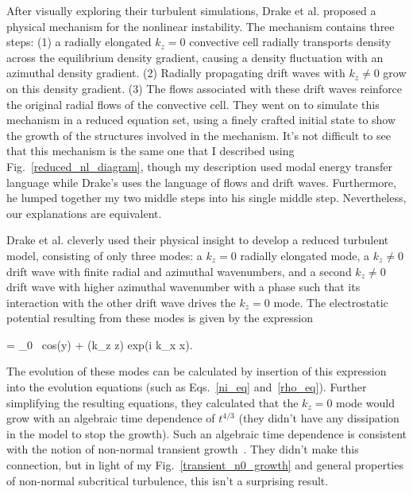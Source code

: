 After visually exploring their turbulent simulations, Drake et al. proposed a physical mechanism for the nonlinear instability. The mechanism contains three steps: (1) a radially elongated $k_z = 0$
convective cell radially transports density across the equilibrium density gradient, causing a density fluctuation with an azimuthal density gradient. (2) Radially propagating 
drift waves with $k_z \ne 0$ grow on this density gradient. (3) The flows associated with these drift waves reinforce the original radial flows of the convective cell. They went on to simulate
this mechanism in a reduced equation set, using a finely crafted initial state to show the growth of the structures involved in the mechanism. It's not difficult to see that this mechanism
is the same one that I described using Fig.~\ref{reduced_nl_diagram}, though my description used modal energy transfer language while Drake's uses the language of flows and drift waves.
Furthermore, he lumped together my two middle steps into his single middle step. Nevertheless, our explanations are equivalent.

Drake et al. cleverly used their physical insight to develop a reduced turbulent model, consisting of only three modes: a $k_z = 0$ radially elongated mode, a $k_z \ne 0$ drift wave with finite
radial and azimuthal wavenumbers, and a second $k_z \ne 0$ drift wave with higher azimuthal wavenumber with a phase such that its interaction with the other drift wave drives the $k_z = 0$
mode. The electrostatic potential resulting from these modes is given by the expression

\beq
\label{drake_potential}
\phi = \phi_0 \ {\rm cos}(\pi y) +  (k_z z) {\rm exp}(i k_x x).
\eeq

The evolution of these modes can be calculated by insertion of this expression into the evolution equations (such as Eqs.~\ref{ni_eq} and~\ref{rho_eq}). Further simplifying the resulting equations, 
they calculated that the $k_z = 0$ mode would grow with an algebraic time dependence of $t^{4/3}$ (they didn't have any dissipation in the model to stop the growth). Such an algebraic time
dependence is consistent with the notion of non-normal transient growth~\cite{waleffe1995}. They didn't make this connection, but in light of my Fig.~\ref{transient_n0_growth} and general
properties of non-normal subcritical turbulence, this isn't a surprising result.

